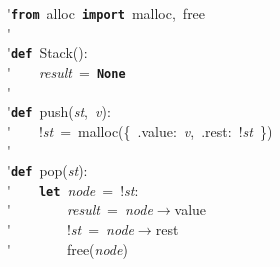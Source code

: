 \'\>\texttt{\textbf{from}}~alloc~\texttt{\textbf{import}}~malloc,~free\\

\'\>\\

\'\>\texttt{\textbf{def}}~Stack():\\

\'\>~~~~\textit{result}~=~\texttt{\textbf{None}}\\

\'\>\\

\'\>\texttt{\textbf{def}}~push(\textit{st},~\textit{v}):\\

\'\>~~~~!\textit{st}~=~malloc(\{~.value:~\textit{v},~.rest:~!\textit{st}~\})\\

\'\>\\

\'\>\texttt{\textbf{def}}~pop(\textit{st}):\\

\'\>~~~~\texttt{\textbf{let}}~\textit{node}~=~!\textit{st}:\\

\'\>~~~~~~~~\textit{result}~=~\textit{node}$\rightarrow$value\\

\'\>~~~~~~~~!\textit{st}~=~\textit{node}$\rightarrow$rest\\

\'\>~~~~~~~~free(\textit{node})